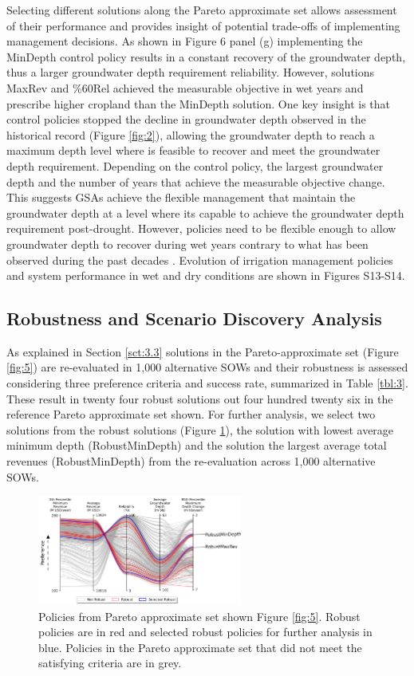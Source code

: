 \documentclass[a4paper,fleqn]{cas-sc}
\begin{document}
Selecting different solutions along the Pareto approximate set allows assessment of their performance and provides insight of potential trade-offs of implementing management decisions. As shown in Figure 6 panel (g) implementing the MinDepth control policy results in a constant recovery of the groundwater depth, thus a larger groundwater depth requirement reliability. However, solutions MaxRev and \%60Rel achieved the measurable objective in wet years and prescribe higher cropland than the MinDepth solution. One key insight is that control policies stopped the decline in groundwater depth observed in the historical record (Figure \ref{fig:2}), allowing the groundwater depth to reach a maximum depth level where is feasible to recover and meet the groundwater depth requirement. Depending on the control policy, the largest groundwater depth and the number of years that achieve the measurable objective change. This suggests GSAs achieve the flexible management that maintain the groundwater depth at a level where its capable to achieve the groundwater depth requirement post-drought. However, policies need to be flexible enough to allow groundwater depth to recover during wet years contrary to what has been observed during the past decades \citep{liu_groundwater_2022,alam_post-drought_2021}. Evolution of irrigation management policies and system performance in wet and dry conditions are shown in Figures S13-S14.

\clearpage
\subsection{Robustness and Scenario Discovery Analysis}

As explained in Section \ref{sct:3.3} solutions in the Pareto-approximate set (Figure \ref{fig:5}) are re-evaluated in 1,000 alternative SOWs and their robustness is assessed considering three preference criteria and success rate, summarized in Table \ref{tbl:3}. These result in twenty four robust solutions out four hundred twenty six in the reference Pareto approximate set shown. For further analysis, we select two solutions from the robust solutions (Figure \ref{fig:7}), the solution with lowest average minimum depth (RobustMinDepth) and the solution the largest average total revenues (RobustMinDepth) from the re-evaluation across 1,000 alternative SOWs. 

\begin{figure}[htb!]
    \includegraphics[width=0.6\textwidth,center]{./figs/selected_robust.png}
    \caption{Policies from Pareto approximate set shown Figure \ref{fig:5}. Robust policies are in red and selected robust policies for further analysis in blue. Policies in the Pareto approximate set that did not meet the satisfying criteria are in grey.} \label{fig:7}
\end{figure} 
\end{document}

